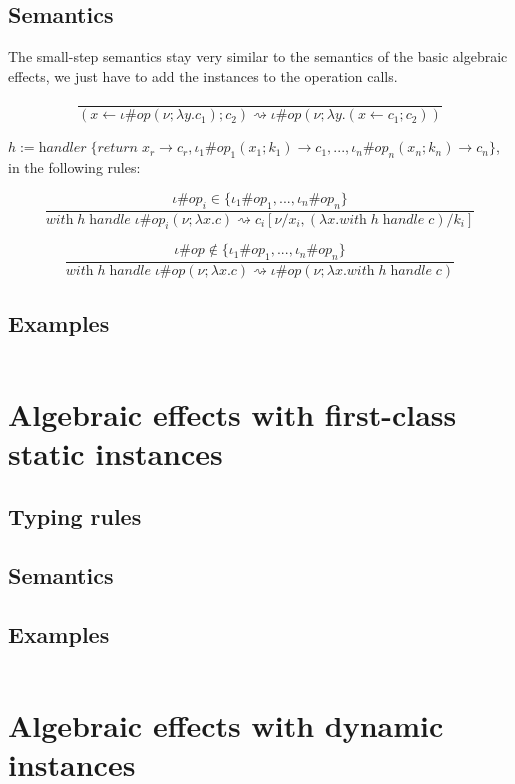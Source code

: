 \documentclass[12pt]{article}
\newcommand\eop[0]{\textit{op}}
\newcommand\inst[0]{\iota}
\newcommand\val[0]{\nu}
\newcommand\vabs[2]{\lambda #1 . #2}
\newcommand\vhandler[1]{\textit{handler} \; \{#1\}}
\newcommand\comp[0]{c}
\newcommand\copi[5]{#1 \# #2(#3 ; \lambda #4 . #5)}
\newcommand\cdo[3]{#1 \leftarrow #2 ; #3}
\newcommand\chandle[2]{\textit{with} \; #1 \; \textit{handle} \; #2}
\begin{document}
\subsection{Semantics}

The small-step semantics stay very similar to the semantics of the basic algebraic effects, we just have to add the instances to the operation calls.

\[\frac{
}{
	(\cdo{x}{\copi{\inst}{\eop}{\val}{y}{\comp_1}}{\comp_2}) \rightsquigarrow \copi{\inst}{\eop}{\val}{y}{(\cdo{x}{\comp_1}{\comp_2})}
}\]

\vspace{20pt}
$h := \vhandler{
		\textit{return} \; x_r \rightarrow \comp_r,
		\inst_1\#\eop_1 (  x_1 ; k_1 ) \rightarrow \comp_1,
		...,
		\inst_n\#\eop_n ( x_n ; k_n ) \rightarrow \comp_n
	}$, in the following rules:
	
\[\frac{
	\inst\#\eop_i \in \{ \inst_1\#\eop_1, ..., \inst_n\#\eop_n \}
}{
	\chandle{h}{\copi{\inst}{\eop_i}{\val}{x}{\comp}} \rightsquigarrow \comp_i[\val / x_i, (\vabs{x}{\chandle{h}{\comp}}) / k_i]
}\]

\[\frac{
	\inst\#\eop \notin \{ \inst_1\#\eop_1, ..., \inst_n\#\eop_n \}
}{
	\chandle{h}{\copi{\inst}{\eop}{\val}{x}{\comp}} \rightsquigarrow \copi{\inst}{\eop}{\val}{x}{\chandle{h}{\comp}}
}\]

\subsection{Examples}
\inputminted{haskell}{code4.txt}

\newpage
\section{Algebraic effects with first-class static instances}
\subsection{Typing rules}
\subsection{Semantics}
\subsection{Examples}
\inputminted{haskell}{code5.txt}

\newpage
\section{Algebraic effects with dynamic instances}
\end{document}
